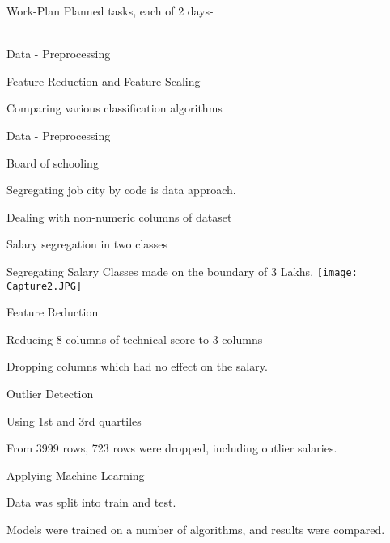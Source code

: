 \documentclass[14pt]{beamer}
\begin{document}
\begin{frame}{Work-Plan}
\pause
Planned tasks, each of 2 days- 
\\~\
\renewcommand{\labelitemi}{$\square $}
 \begin{fullpageitemize}
  \item Data - Preprocessing
  \item Feature Reduction and Feature Scaling 
  \item Comparing various classification algorithms 
 \end{fullpageitemize}
\end{frame}
\begin{frame}{Data - Preprocessing}
\pause
\renewcommand{\labelitemi}{$\square$}
 \begin{fullpageitemize}
  \item Board of schooling
  \item Segregating job city by code is data approach. 
  \item Dealing with non-numeric columns of dataset
  \item Salary segregation in two classes
 \end{fullpageitemize}
\end{frame}
\begin{frame}{Segregating Salary}
Classes made on the boundary of 3 Lakhs.
\pause
\texttt{[image: Capture2.JPG]}
\end{frame}
\begin{frame}{Feature Reduction}
\pause
\renewcommand{\labelitemi}{$\square$}
 \begin{fullpageitemize}
  \item Reducing 8 columns of  technical score to 3 columns
  \item Dropping columns which had no effect on the salary.
 \end{fullpageitemize}
\end{frame}
\begin{frame}{Outlier Detection}
\pause
\renewcommand{\labelitemi}{$\square$}
 \begin{fullpageitemize}
  \item Using 1st and 3rd quartiles
  \item From 3999 rows, 723 rows were dropped, including outlier salaries.
 \end{fullpageitemize}
\end{frame}
\begin{frame}{Applying Machine Learning}
\pause
\renewcommand{\labelitemi}{$\square$}
 \begin{fullpageitemize}
  \item Data was split into train and test.
  \item Models were trained on a number of algorithms, and results were compared.
 \end{fullpageitemize}
\end{frame}
\end{document}
